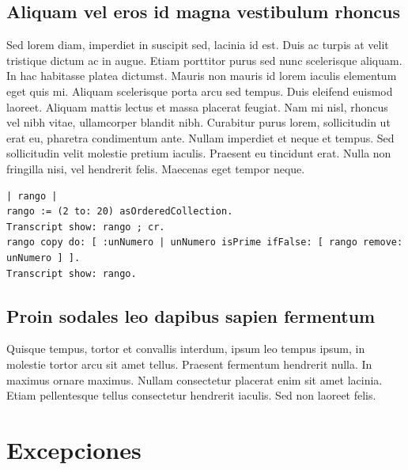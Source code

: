 \documentclass[titlepage,a4paper]{article}
\begin{document}
\subsection{Aliquam vel eros id magna vestibulum rhoncus}
Sed lorem diam, imperdiet in suscipit sed, lacinia id est. Duis ac turpis at velit tristique dictum ac in augue. Etiam porttitor purus sed nunc scelerisque aliquam. In hac habitasse platea dictumst. Mauris non mauris id lorem iaculis elementum eget quis mi. Aliquam scelerisque porta arcu sed tempus. Duis eleifend euismod laoreet. Aliquam mattis lectus et massa placerat feugiat. Nam mi nisl, rhoncus vel nibh vitae, ullamcorper blandit nibh. Curabitur purus lorem, sollicitudin ut erat eu, pharetra condimentum ante. Nullam imperdiet et neque et tempus. Sed sollicitudin velit molestie pretium iaculis. Praesent eu tincidunt erat. Nulla non fringilla nisi, vel hendrerit felis. Maecenas eget tempor neque.

\begin{verbatim}
| rango |
rango := (2 to: 20) asOrderedCollection.
Transcript show: rango ; cr.
rango copy do: [ :unNumero | unNumero isPrime ifFalse: [ rango remove: unNumero ] ].
Transcript show: rango.
\end{verbatim}

\subsection{Proin sodales leo dapibus sapien fermentum}
Quisque tempus, tortor et convallis interdum, ipsum leo tempus ipsum, in molestie tortor arcu sit amet tellus. Praesent fermentum hendrerit nulla. In maximus ornare maximus. Nullam consectetur placerat enim sit amet lacinia. Etiam pellentesque tellus consectetur hendrerit iaculis. Sed non laoreet felis.

\section{Excepciones}\label{sec:excepciones}
\end{document}

